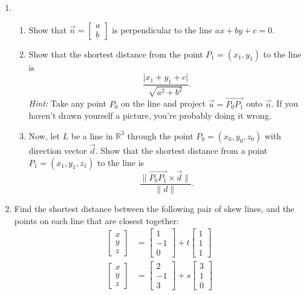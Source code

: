 \documentclass[letterpaper,12pt]{article}
\newcommand{\len}[1]{\lVert #1\rVert}
\newcommand{\abs}[1]{\lvert #1\rvert}
\newcommand{\R}{\mathbb{R}}
\begin{document}
\begin{enumerate}
\begin{enumerate}
\end{enumerate}
\item \begin{enumerate}
       \item Show that $\vec{n} = \begin{bmatrix}a\\b\end{bmatrix}$ is perpendicular to the line $ax+by+c=0$.
       \item Show that the shortest distance from the point $P_1=(x_1,y_1)$ to the line is
\[
 \frac{\abs{x_1+y_1+c}}{\sqrt{a^2+b^2}}.
\]
{\em Hint: } Take any point $P_0$ on the line and project $\vec{u}=\overrightarrow{P_0P_1}$ onto $\vec{n}$. If you haven't drawn yourself a picture, you're probably doing it wrong.
       \item Now, let $L$ be a line in $\R^3$ through the point $P_0=(x_0,y_0,z_0)$ with direction vector $\vec{d}$. Show that the shortest distance from a point $P_1=(x_1,y_1,z_1)$ to the line is
\[
 \frac{\len{\overrightarrow{P_0P_1}\times \vec{d}}}{\len{d}}.
\]

      \end{enumerate}
\item Find the shortest distance between the following pair of skew lines, and the points on each line that are closest together:
\begin{align*}
        \begin{bmatrix}x\\y\\z\end{bmatrix} & = \begin{bmatrix}1\\-1\\0\end{bmatrix}+t\begin{bmatrix}1\\1\\1\end{bmatrix}\\
        \begin{bmatrix}x\\y\\z\end{bmatrix} & = \begin{bmatrix}2\\-1\\3\end{bmatrix}+s\begin{bmatrix}3\\1\\0\end{bmatrix}\\
       \end{align*}

\end{enumerate}
\end{document}
